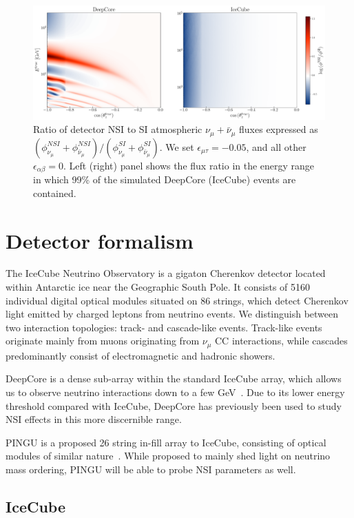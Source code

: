 \documentclass[draft=True]{revtex4-2}
\newcommand{\emt}{\ensuremath{\epsilon_{\mu\tau}}}
\newcommand{\nm}{\nu_\mu}
\begin{document}
\begin{figure}[!tb]
   \begin{center}
      \includegraphics[width=0.8\linewidth]{figures/flux_ratio.pdf}
   \end{center}
   \caption{Ratio of detector NSI to SI atmospheric $\nu_\mu + \bar{\nu}_\mu$ fluxes expressed as $(\phi_{\nu_\mu}^{NSI} + \phi_{\bar\nu_\mu}^{NSI})/(\phi_{\nu_\mu}^{SI} + \phi_{\bar\nu_\mu}^{SI})$.
   We set $\emt = -0.05$, and all other $\epsilon_{\alpha\beta}=0$. 
   Left (right) panel shows the flux ratio in the energy range in which 99\% of the simulated DeepCore (IceCube) events are contained.
   }\label{fig:flux_ratio}
\end{figure}%

\section{Detector formalism}
The IceCube Neutrino Observatory is a gigaton Cherenkov detector located within Antarctic ice near the Geographic 
South Pole. It consists of 5160 individual digital optical modules situated on 86 strings, which detect Cherenkov light emitted by charged leptons
from neutrino events. We distinguish between two interaction topologies: track- and cascade-like events. Track-like events originate mainly
from muons originating from $\nm$ CC interactions, while cascades predominantly consist of electromagnetic and hadronic showers. 

DeepCore is a dense sub-array within the standard IceCube array, which allows us to observe neutrino interactions down to a few GeV~\cite{DC2021}.
Due to its lower energy threshold compared with IceCube, DeepCore has previously been used to study NSI effects in this more discernible range\cite{DC2021,deepcoreNSI}.

PINGU is a proposed 26 string in-fill array to IceCube, consisting of optical modules of similar nature~\cite{PINGUletter}. While proposed to mainly shed light on 
neutrino mass ordering, PINGU will be able to probe NSI parameters as well.  
\subsection{IceCube}\label{ch:ICmethod}
\end{document}
